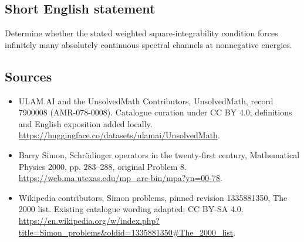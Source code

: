 \documentclass[11pt]{article}
\begin{document}
\subsection{Short English statement}
Determine whether the stated weighted square-integrability condition forces infinitely many absolutely continuous spectral channels at nonnegative energies.
\subsection{Sources}
\begin{itemize}
\item[\hypertarget{source:7900008:1}{S1}] ULAM.AI and the UnsolvedMath Contributors, UnsolvedMath, record 7900008 (AMR-078-0008). Catalogue curation under CC BY 4.0; definitions and English exposition added locally.
\url{https://huggingface.co/datasets/ulamai/UnsolvedMath}.
\item[\hypertarget{source:7900008:2}{S2}] Barry Simon, Schrödinger operators in the twenty-first century, Mathematical Physics 2000, pp. 283–288, original Problem 8.
\url{https://web.ma.utexas.edu/mp_arc-bin/mpa?yn=00-78}.
\item[\hypertarget{source:7900008:3}{S3}] Wikipedia contributors, Simon problems, pinned revision 1335881350, The 2000 list. Existing catalogue wording adapted; CC BY-SA 4.0.
\url{https://en.wikipedia.org/w/index.php?title=Simon_problems&oldid=1335881350#The_2000_list}.
\end{itemize}
\label{end:7900008}
\end{document}
